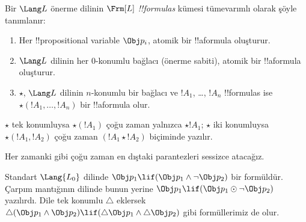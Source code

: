 



\begin{defn}[Formül]
Bir $\Lang L$ önerme dilinin $\Frm[L]$ \emph{!!{formula}s} kümesi
tümevarımlı olarak şöyle tanımlanır:
\begin{enumerate}
\item Her !!{propositional variable} $\Obj p_i$, atomik bir !!a{formula}
  oluşturur.
\item $\Lang L$ dilinin her $0$-konumlu bağlacı (önerme sabiti), atomik
  bir !!a{formula} oluşturur.
\item $\star$, $\Lang L$ dilinin $n$-konumlu bir bağlacı ve $!A_1$,
\dots, $!A_n$ !!{formula}s ise $\star(!A_1,\dots,!A_n)$ bir
!!a{formula} olur.
\end{enumerate}
$\star$ tek konumluysa $\star(!A_1)$ çoğu zaman yalnızca $\star !A_1$;
$\star$ iki konumluysa $\star(!A_1,!A_2)$ çoğu zaman
$(!A_1\star !A_2)$ biçiminde yazılır.
\end{defn}

Her zamanki gibi çoğu zaman en dıştaki parantezleri sessizce atacağız.

\begin{ex}
Standart $\Lang{L_0}$ dilinde
$\Obj p_1 \lif (\Obj p_1 \land \lnot \Obj p_2)$ bir formüldür. Çarpım
mantığının dilinde bunun yerine
$\Obj p_1 \lif (\Obj p_1 \odot \lnot \Obj p_2)$ yazılırdı. Dile tek
konumlu $\triangle$ eklersek
$\triangle (\Obj p_1 \land \Obj p_2) \lif
(\triangle \Obj p_1 \land \triangle \Obj p_2)$ gibi formüllerimiz de olur.
\end{ex}

